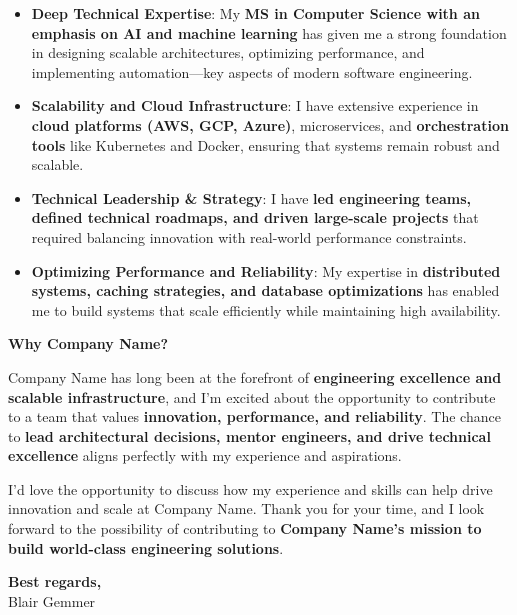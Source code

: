 \documentclass[a4paper,10.5pt]{article}
\newcommand{\applicantName}{Blair Gemmer}
\newcommand{\companyName}{Company Name}
\begin{document}
\begin{itemize}
    \item \textbf{Deep Technical Expertise}: My \textbf{MS in Computer Science with an emphasis on AI and machine learning} has given me a strong foundation in designing scalable architectures, optimizing performance, and implementing automation—key aspects of modern software engineering.
    \item \textbf{Scalability and Cloud Infrastructure}: I have extensive experience in \textbf{cloud platforms (AWS, GCP, Azure)}, microservices, and \textbf{orchestration tools} like Kubernetes and Docker, ensuring that systems remain robust and scalable.
    \item \textbf{Technical Leadership \& Strategy}: I have \textbf{led engineering teams, defined technical roadmaps, and driven large-scale projects} that required balancing innovation with real-world performance constraints.
    \item \textbf{Optimizing Performance and Reliability}: My expertise in \textbf{distributed systems, caching strategies, and database optimizations} has enabled me to build systems that scale efficiently while maintaining high availability.
\end{itemize}

\vspace{0.5cm}

\noindent
\textbf{Why \companyName?}

\companyName{} has long been at the forefront of \textbf{engineering excellence and scalable infrastructure}, and I’m excited about the opportunity to contribute to a team that values \textbf{innovation, performance, and reliability}. The chance to \textbf{lead architectural decisions, mentor engineers, and drive technical excellence} aligns perfectly with my experience and aspirations.


\vspace{0.5cm}

I’d love the opportunity to discuss how my experience and skills can help drive innovation and scale at \companyName{}. Thank you for your time, and I look forward to the possibility of contributing to \textbf{\companyName’s mission to build world-class engineering solutions}.



\vspace{0.5cm}

\noindent
\textbf{Best regards,} \\
\applicantName
\end{document}

